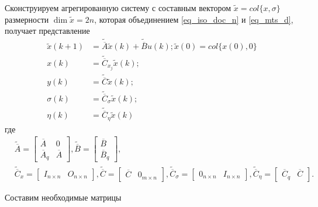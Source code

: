 Сконструируем агрегированную систему с составным вектором $\tilde{x} = col\{x, \sigma\}$ размерности $ \dim \tilde{x} = 2n$, которая объединением \ref{eq_iso_doc_n} и \ref{eq_mts_d}, получает представление
\begin{align}\label{rang_system_d}
	\tilde{x}(k+1) &= \tilde{\overline{A}} \tilde{x} (k) + \tilde{\overline{B}} u(k); 
	\tilde{x} (0) = col \{x(0), 0\}\\
	x(k) &= \tilde{\overline{C}}_{x_j} \tilde{x}(k);\\
	y(k) &= \tilde{\overline{C}} \tilde{x} (k);\\
	\sigma (k) &= \tilde{\overline{C}}_{\sigma} \tilde{x} (k);\\
	\eta (k) &= \tilde{\overline{C}}_{\eta} \tilde{x} (k)
\end{align}
где 
\begin{align*}
	&\tilde{\overline{A}} =
	\begin{bmatrix}
	\overline{A} & 0\\
	\overline{A}_{q} & \overline{A}
	\end{bmatrix},
	\tilde{\overline{B}} = 
	\begin{bmatrix}
	\overline{B}\\
	\overline{B}_{q}
	\end{bmatrix},\\
	&\tilde{\overline{C}}_{x} = 
	\begin{bmatrix}
	I_{n \times n} & O_{n \times n}
	\end{bmatrix},
	\tilde{\overline{C}} = 
	\begin{bmatrix}
	\overline{C} & 0_{m \times n}
	\end{bmatrix},
	\tilde{\overline{C}}_{\sigma} = 
	\begin{bmatrix}
	0_{n \times n} & I_{n \times n}
	\end{bmatrix},
	\tilde{\overline{C}}_{\eta} = 
	\begin{bmatrix}
	\overline{C}_{q} & \overline{C}
	\end{bmatrix}.	
\end{align*}

Составим необходимые матрицы

